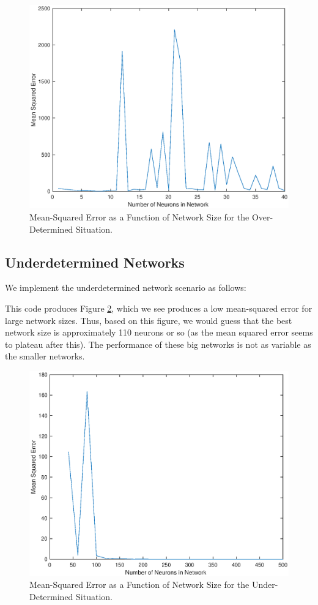 \documentclass[11pt, oneside]{article}
\begin{document}
\begin{figure}[ht!]
\includegraphics[width=1\textwidth]{Q2PartB.eps}
\caption{Mean-Squared Error as a Function of Network Size for the Over-Determined Situation.}
\label{fig:overdetermined}
\end{figure}

\subsection{Underdetermined Networks}

We implement the underdetermined network scenario as follows:

This code produces Figure \ref{fig:underdetermined}, which we see produces a low mean-squared error for large network sizes. Thus, based on this figure, we would guess that the best network size is approximately 110 neurons or so (as the mean squared error seems to plateau after this). The performance of these big networks is not as variable as the smaller networks.

\begin{figure}[ht!]
\includegraphics[width=1\textwidth]{Q2PartC.eps}
\caption{Mean-Squared Error as a Function of Network Size for the Under-Determined Situation.}
\label{fig:underdetermined}
\end{figure}
\end{document}
